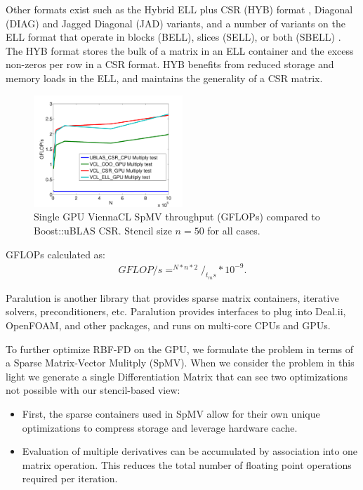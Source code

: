 \documentclass{report}
\begin{document}
Other formats exist such as the Hybrid ELL plus CSR (HYB) format \cite{Bell2009}, Diagonal (DIAG) and Jagged Diagonal (JAD) variants, and a number of variants on the ELL format that operate in blocks (BELL), slices (SELL), or both (SBELL) \cite{SuKeutzer2012}. The HYB format stores the bulk of a matrix in an ELL container and the excess non-zeros per row in a CSR format. HYB benefits from reduced storage and memory loads in the ELL, and maintains the generality of a CSR matrix. 

\begin{figure}
\centering
\includegraphics[width=0.5\textwidth]{../figures/spmv/spmv_vcl_gflops-eps-converted-to.pdf}
\caption{Single GPU ViennaCL SpMV throughput (GFLOPs) compared to Boost::uBLAS CSR. Stencil size $n=50$ for all cases.}
\label{fig:spmv_vcl_gflops}
\end{figure}

GFLOPs calculated as: 
\begin{align}
GFLOP/s = ^{N * n * 2} /_{t_ms} * 10^{-9}. 
\end{align}



Paralution is another library that provides sparse matrix containers, iterative solvers, preconditioners, etc. Paralution provides interfaces to plug into Deal.ii, OpenFOAM, and other packages, and runs on multi-core CPUs and GPUs. 


To further optimize RBF-FD on the GPU, we formulate the problem in terms of a Sparse Matrix-Vector Mulitply (SpMV). When we consider the problem in this light we generate a single Differentiation Matrix that can see two optimizations not possible with our stencil-based view: 
\begin{itemize} 
\item First, the sparse containers used in SpMV allow for their own unique optimizations to compress storage and leverage hardware cache.
\item Evaluation of multiple derivatives can be accumulated by association into one matrix operation. This reduces the total number of floating point operations required per iteration. 
\end{itemize}
\end{document}
